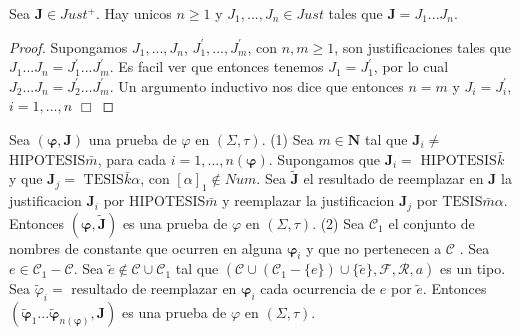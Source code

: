   \begin{lemma}
    Sea \(\mathbf{J}\in Just^{+}\). Hay unicos \(n\geq 1\) y \(J_{1},...,J_{n}\in Just\) tales que \(\mathbf{J}=J_{1}...J_{n}\).
  \end{lemma}
  \begin{proof}
    Supongamos \(J_{1},...,J_{n}\), \(J_{1}^{\prime },...,J_{m}^{\prime }\), con \( n,m\geq 1\), son justificaciones tales que \(J_{1}...J_{n}=J_{1}^{\prime }...J_{m}^{\prime }\). Es facil ver que entonces tenemos \(J_{1}=J_{1}^{\prime }\), por lo cual \(J_{2}...J_{n}=J_{2}^{\prime }...J_{m}^{\prime }\). Un argumento inductivo nos dice que entonces \(n=m\) y \(J_{i}=J_{i}^{\prime }\), \( i=1,...,n\) \(\Box\)
  \end{proof}

  \begin{lemma}
    Sea \((\mathbf{\varphi },\mathbf{J})\) una prueba de \( \varphi \) en \((\Sigma ,\tau )\).
    (1) Sea \(m\in \mathbf{N}\) tal que \(\mathbf{J}_{i}\neq \) \(\mathrm{ HIPOTESIS}\bar{m}\), para cada \(i=1,...,n(\mathbf{\varphi })\). Supongamos que \(\mathbf{J}_{i}=\) \(\mathrm{HIPOTESIS}\bar{k}\) y que \(\mathbf{J}_{j}=\) \( \mathrm{TESIS}\bar{k}\alpha \), con \([\alpha ]_{1}\notin Num\). Sea \(\mathbf{ \tilde{J}}\) el resultado de reemplazar en \(\mathbf{J}\) la justificacion \( \mathbf{J}_{i}\) por \(\mathrm{HIPOTESIS}\bar{m}\) y reemplazar la justificacion \(\mathbf{J}_{j}\) por \(\mathrm{TESIS}\bar{m}\alpha \). Entonces \( (\mathbf{\varphi },\mathbf{\tilde{J}})\) es una prueba de \(\varphi \) en \( (\Sigma ,\tau )\).
    (2) Sea \(\mathcal{C}_{1}\) el conjunto de nombres de constante que ocurren en alguna \(\mathbf{\varphi }_{i}\) y que no pertenecen a \(\mathcal{C}\) . Sea \(e\in \mathcal{C}_{1}-\mathcal{C}\). Sea \(\tilde{e}\notin \mathcal{C} \cup \mathcal{C}_{1}\) tal que \((\mathcal{C}\cup (\mathcal{C}_{1}-\{e\})\cup \{\tilde{e}\},\mathcal{F},\mathcal{R},a)\) es un tipo. Sea \(\tilde{\varphi} _{i}=\) resultado de reemplazar en \(\mathbf{\varphi }_{i}\) cada ocurrencia de \(e\) por \(\tilde{e}.\) Entonces \((\mathbf{\tilde{\varphi}}_{1}...\mathbf{ \tilde{\varphi}}_{n(\mathbf{\varphi })},\mathbf{J})\) es una prueba de \( \varphi \) en \((\Sigma ,\tau )\).
  \end{lemma}
